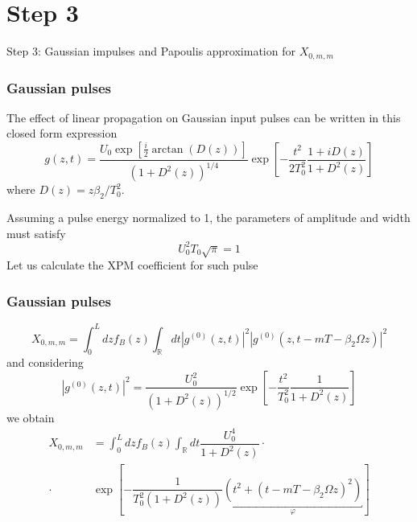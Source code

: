 \documentclass[8pt]{beamer} %
\begin{document}
\section{Step 3}
\begin{frame}
    \Huge{Step 3: Gaussian impulses and Papoulis approximation for $X_{0, m, m}$}
\end{frame}

\begin{frame}
    \frametitle{Gaussian pulses}
    The effect of linear propagation on Gaussian input pulses can be written in this closed form expression
    \begin{equation}\label{eq:field}
        g(z, t) = \frac{U_0 \exp[\frac{i}{2} \arctan(D(z))]}{(1+D^2(z))^{1/4}} \exp\left[-\frac{t^2}{2T_0^2} \frac{1+iD(z)}{1+D^2(z)}\right]
    \end{equation}
    where $D(z) = z\beta_2 / T_0^2$.
    \vspace{10pt}

    Assuming a pulse energy normalized to 1, the parameters of amplitude and width must satisfy
    \begin{equation}\label{eq:norm}
        U_0^2T_0 \sqrt{\pi} = 1
    \end{equation}
    Let us calculate the XPM coefficient for such pulse
\end{frame}

\begin{frame}
    \frametitle{Gaussian pulses}
    \begin{equation}
        X_{0, m, m} = \int_{0}^{L}dz f_B(z) \int_{\mathbb{R}}dt |g^{(0)}(z, t)|^2 |g^{(0)}(z, t- m T-\beta_2\Omega z)|^2
    \end{equation}
    and considering
    \begin{equation*}
        |g^{(0)}(z, t)|^2 = \dfrac{U_0^2}{(1+D^2(z))^{1/2}}\exp\left[-\dfrac{t^2}{T_0^2} \dfrac{1}{1+D^2(z)}\right]
    \end{equation*}
    we obtain
    \begin{align*}
        X_{0, m, m} & = \int_{0}^{L}dz f_B(z) \int_{\mathbb{R}}dt
        \dfrac{U_0^4}{1+D^2(z)} \cdot                             \\ \cdot  &\exp\left[-\dfrac{1}{T_0^2(1+D^2(z))}
            \underbracket{\left(t^2 + (t-mT-\beta_2\Omega z)^2\right)}_{\varphi}\right]
    \end{align*}
\end{frame}
\end{document}
